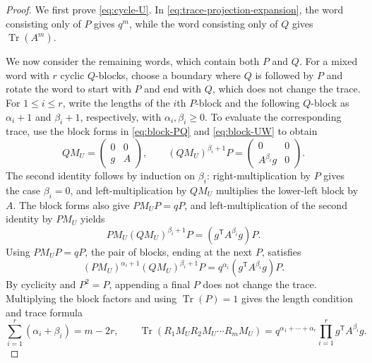 \documentclass[11pt]{article}
\theoremstyle{remark}
\numberwithin{equation}{section}
\newcommand{\Tr}{\operatorname{Tr}}
\begin{document}
\begin{proof}
  We first prove \eqref{eq:cycle-U}.
  In \eqref{eq:trace-projection-expansion}, the word consisting only of $P$ gives $q^m$, while the word consisting only of $Q$ gives $\Tr(A^m)$.

  We now consider the remaining words, which contain both $P$ and $Q$.
  For a mixed word with $r$ cyclic $Q$-blocks, choose a boundary where $Q$ is followed by $P$ and rotate the word to start with $P$ and end with $Q$, which does not change the trace.
  For $1\le i\le r$, write the lengths of the $i$th $P$-block and the following $Q$-block as $\alpha_i+1$ and $\beta_i+1$, respectively, with $\alpha_i,\beta_i\ge0$.
  To evaluate the corresponding trace, use the block forms in \eqref{eq:block-PQ} and \eqref{eq:block-UW} to obtain
  \[
    Q M_U=\begin{pmatrix}0&0\\g&A\end{pmatrix},
    \qquad
    (Q M_U)^{\beta_i+1}P
    =\begin{pmatrix}0&0\\A^{\beta_i}g&0\end{pmatrix}.
  \]
  The second identity follows by induction on $\beta_i$: right-multiplication by $P$ gives the case $\beta_i=0$, and left-multiplication by $Q M_U$ multiplies the lower-left block by $A$.
  The block forms also give $P M_U P=qP$, and left-multiplication of the second identity by $P M_U$ yields
  \[
    P M_U(Q M_U)^{\beta_i+1}P
    =(g^{\mathsf T}A^{\beta_i}g)P.
  \]
  Using $P M_U P=qP$, the pair of blocks, ending at the next $P$, satisfies
  \[
    (P M_U)^{\alpha_i+1}(Q M_U)^{\beta_i+1}P
    =q^{\alpha_i}(g^{\mathsf T}A^{\beta_i}g)P.
  \]
  By cyclicity and $P^2=P$, appending a final $P$ does not change the trace.
  Multiplying the block factors and using $\Tr(P)=1$ gives the length condition and trace formula
  \begin{equation}\label{eq:excursion-length-weight}
    \sum_{i=1}^r(\alpha_i+\beta_i)=m-2r,
    \qquad
    \Tr(R_1M_UR_2M_U\cdots R_mM_U)
    =q^{\alpha_1+\cdots+\alpha_r}
     \prod_{i=1}^rg^{\mathsf T}A^{\beta_i}g.
  \end{equation}


\end{proof}
\end{document}
